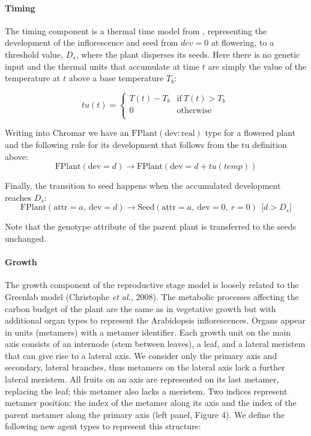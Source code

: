 \documentclass[phd]{infthesis}
\newcommand{\mr}[1]{\mathrm{#1}}
\newcommand{\ar}[2]{\mr{#1} \! = \! {#2}}
\begin{document}
\paragraph{Timing}
\label{timing-1}

The timing component is a thermal time model from
\citet{burghardt_modeling_2015}, representing the development of the
inflorescence and seed from \(dev = 0\) at flowering, to a threshold value,
\(D_{s}\), where the plant disperses its seeds. Here there is no genetic input
and the thermal units that accumulate at time \(t\) are simply the value of the
temperature at \(t\) above a base temperature \(T_{b}\):

\[tu(t) = \left\{ \begin{matrix}
T(t) - T_{b} & \mr{if\ }T(t) > T_{b} \\
0 & \mr{otherwise} \\
\end{matrix} \right.\ \]

Writing into Chromar we have an
\(\mr{FPlant}(\mr{dev}:\mr{real})\) type for a flowered plant and
the following rule for its development that follows from the
\(\mr{tu}\) definition above:
$$
\mr{FPlant}( \ar{dev}{d} ) \xrightarrow{} \mr{FPlant}(\ar{dev}{d + tu(temp)})
$$

Finally, the transition to seed happens when the accumulated development
reaches \(D_{s}\):
\[\mr{FPlant}( \mr{attr} = a,\mr{\ dev} = d ) \rightarrow \mr{Seed}( \mr{attr} = a,\ \mr{dev} = 0,\ r = 0 )\ \ \lbrack d > D_{s}\rbrack\]

Note that the genotype attribute of the parent plant is transferred to
the seeds unchanged.

\paragraph{Growth}
\label{growth-1}

The growth component of the reproductive stage model is loosely related
to the Greenlab model (Christophe \emph{et al.}, 2008). The metabolic
processes affecting the carbon budget of the plant are the same as in
vegetative growth but with additional organ types to represent the
Arabidopsis inflorescences. Organs appear in units (metamers) with a
metamer identifier. Each growth unit on the main axis consists of an
internode (stem between leaves), a leaf, and a lateral meristem that can
give rise to a lateral axis. We consider only the primary axis and
secondary, lateral branches, thus metamers on the lateral axis lack a
further lateral meristem. All fruits on an axis are represented on its
last metamer, replacing the leaf; this metamer also lacks a meristem.
Two indices represent metamer position: the index of the metamer along
its axis and the index of the parent metamer along the primary axis
(left panel, Figure 4). We define the following new agent types to
represent this structure:
\end{document}
